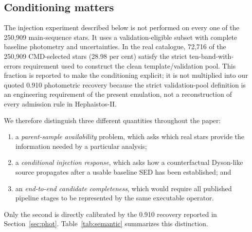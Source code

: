 \documentclass[fleqn,usenatbib]{mnras}
\begin{document}
\subsection{Conditioning matters}
\label{sec:conditioning}

The injection experiment described below is not performed on every one of the 250,909 main-sequence stars. It uses a validation-eligible subset with complete baseline photometry and uncertainties. In the real catalogue, 72,716 of the 250,909 CMD-selected stars (28.98 per cent) satisfy the strict ten-band-with-errors requirement used to construct the clean template/validation pool. This fraction is reported to make the conditioning explicit; it is not multiplied into our quoted 0.910 photometric recovery because the strict validation-pool definition is an engineering requirement of the present emulation, not a reconstruction of every admission rule in Hephaistos-II.

We therefore distinguish three different quantities throughout the paper:
\begin{enumerate}
\item a \emph{parent-sample availability} problem, which asks which real stars provide the information needed by a particular analysis;
\item a \emph{conditional injection response}, which asks how a counterfactual Dyson-like source propagates after a usable baseline SED has been established; and
\item an \emph{end-to-end candidate completeness}, which would require all published pipeline stages to be represented by the same executable operator.
\end{enumerate}
Only the second is directly calibrated by the 0.910 recovery reported in Section~\ref{sec:phot}. Table~\ref{tab:semantic} summarizes this distinction.
\end{document}
